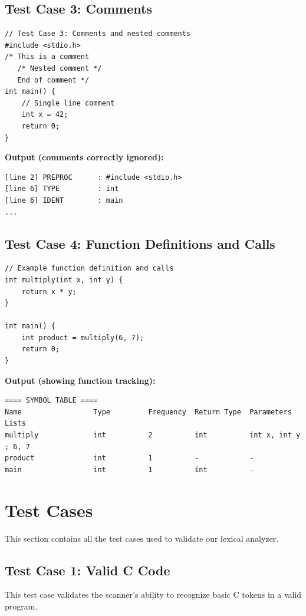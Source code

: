 \documentclass[12pt]{article}
\begin{document}
\subsection{Test Case 3: Comments}

\begin{verbatim}
// Test Case 3: Comments and nested comments
#include <stdio.h>
/* This is a comment
   /* Nested comment */
   End of comment */
int main() {
    // Single line comment
    int x = 42;
    return 0;
}
\end{verbatim}

\noindent
\textbf{Output (comments correctly ignored):}
\begin{verbatim}
[line 2] PREPROC      : #include <stdio.h>
[line 6] TYPE         : int
[line 6] IDENT        : main
...
\end{verbatim}

\subsection{Test Case 4: Function Definitions and Calls}

\begin{verbatim}
// Example function definition and calls
int multiply(int x, int y) {
    return x * y;
}

int main() {
    int product = multiply(6, 7);
    return 0;
}
\end{verbatim}

\noindent
\textbf{Output (showing function tracking):}
\begin{verbatim}
==== SYMBOL TABLE ====
Name                 Type         Frequency  Return Type  Parameters Lists
multiply             int          2          int          int x, int y ; 6, 7
product              int          1          -            -
main                 int          1          int          -
\end{verbatim}

\section{Test Cases}

This section contains all the test cases used to validate our lexical analyzer.

\subsection{Test Case 1: Valid C Code}

This test case validates the scanner's ability to recognize basic C tokens in a valid program.
\end{document}
